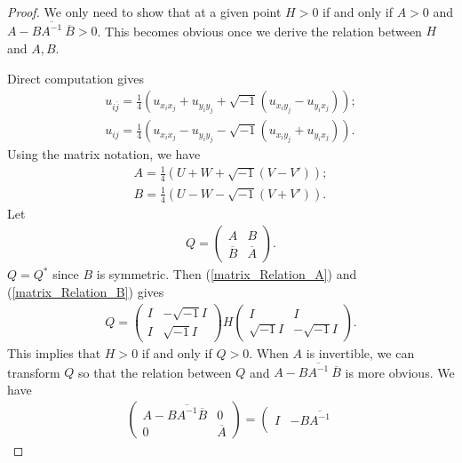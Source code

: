 \documentclass{article}
\numberwithin{equation}{section}
\newcommand{\ijbar}{{i\overline j}}
\begin{document}
\begin{proof}
	We only need to show that at a given point $H>0$  if and only if $A>0$ and $A-B\overline{A^{-1}}\ \overline B>0$. This becomes  obvious once we derive the relation between $H$ and $A, B$.
	
	Direct computation gives
	\begin{align}
		u_{\ijbar}=\frac{1}{4}\left(u_{x_ix_j}+u_{y_iy_j}+\sqrt{-1}(u_{x_iy_j}-u_{y_ix_j})\right);\\
			u_{ij}=\frac{1}{4}\left(u_{x_ix_j}-u_{y_iy_j}-\sqrt{-1}(u_{x_iy_j}+u_{y_ix_j})\right).
	\end{align}Using the matrix notation, we have
	\begin{align}
		\label{matrix_Relation_A}
		A=\frac{1}{4}(U+W+\sqrt{-1}(V-V'));\\
				\label{matrix_Relation_B}
		B=\frac{1}{4}(U-W-\sqrt{-1}(V+V')).
	\end{align}
	  Let
	  \begin{align}
	  	Q=\left(
	  	\begin{array}{cc}
	  	A	&  B    \\
	  	\overline{B}	&\overline{A}
	  	\end{array}
	  	\right).
	  \end{align}
	  $Q=Q^\ast$ since $B$ is symmetric. 
	  Then (\ref{matrix_Relation_A}) and (\ref{matrix_Relation_B}) gives
	  \begin{align}
	  	\label{QH}
	  	Q=\left(
	  	\begin{array}{cc}
	  	I	&  -\sqrt{-1}I   \\
	  	I	&   \sqrt{-1}I
	  	\end{array}
	  	\right)  H
	  	\left(
	  	\begin{array}{cc}
	  		I	& I   \\
	  	 \sqrt{-1}	I	&  - \sqrt{-1}I
	  	\end{array}
	  	\right).
	  \end{align}
	  This implies that $H>0$ if and only if $Q>0$. When $A$ is invertible, we can transform $Q$ so that the relation between $Q$ and $A-B\overline{A^{-1}}\ \overline{B}$ is more obvious. We have
	  \begin{align}
	  	\left(\begin{array}{cc}
	  		A-B\overline{A^{-1}}\overline{B}& 0\\
	  		0& \overline{A}
	  	\end{array}\right)
	  	=\left(\begin{array}{cc}
	  		I& -B\overline{A^{-1}}\\

\end{array}
\end{align}
\end{proof}
\end{document}
